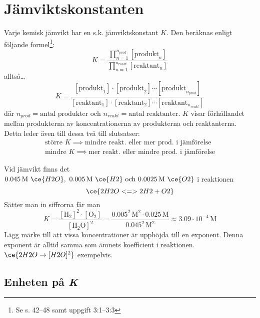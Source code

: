 \section{Jämviktskonstanten}

Varje kemisk jämvikt har en s.k. jämviktskonstant $K$. Den beräknas enligt följande formel\footnote{Se s. 42--48 samt uppgift 3:1--3:3}:
\begin{equation*}
    \label{eq:jmvkonstant}
    K = \frac{\prod_{n=1}^{n_{prod}}[\mathrm{produkt}_n]}{\prod_{n=1}^{n_{reakt}}[\mathrm{reaktant}_n]}
\end{equation*}
alltså\ldots
\begin{equation*}
    K = \frac{[\mathrm{produkt}_1] \cdot [\mathrm{produkt}_2] \dotsm [\mathrm{produkt}_{n_{prod}}]}{[\mathrm{reaktant}_1] \cdot [\mathrm{reaktant}_2] \dotsm [\mathrm{reaktant}_{n_{reakt}}]}
\end{equation*}
där $n_{prod} = \text{antal produkter och } n_{reakt} = \text{antal reaktanter}$. $K$ visar förhållandet mellan produkterna av koncentrationerna av produkterna och reaktanterna. Detta leder även till dessa två till slutsatser:
\begin{align*}
    \text{större } K \implies \text{mindre reakt. eller mer prod. i jämförelse} \\
    \text{mindre } K \implies \text{mer reakt. eller mindre prod. i jämförelse} 
\end{align*}
\begin{exm}
    Vid jämvikt finns det $ \mathrm{0.045\,M} \ \ce{H2O},\ \mathrm{0.005\,M} \ \ce{H2} \text{ och } \mathrm{0.0025\,M} \ \ce{O2}$ i reaktionen
    \begin{equation*}
        \ce{2H2O <=> 2H2 + O2}
    \end{equation*}
    Sätter man in siffrorna får man
    \begin{equation*}
        K = \frac{\mathrm{[H_2]^2 \cdot [O_2]}}{\mathrm{[H_2O]^2}} = \frac{0.005^2\,\mathrm{M^2} \cdot 0.025\,\mathrm{M}}{0.045^2\,\mathrm{M^2}} \approx 3.09 \cdot 10^{-4} \, \mathrm{M}
    \end{equation*}
    Lägg märke till att vissa koncentrationer är upphöjda till en exponent. Denna exponent är alltid samma som ämnets koefficient i reaktionen. \\ $\ce{2H2O \rightarrow [H2O]^2}$ exempelvis.
\end{exm}

\subsection{Enheten på \textit{K}}

